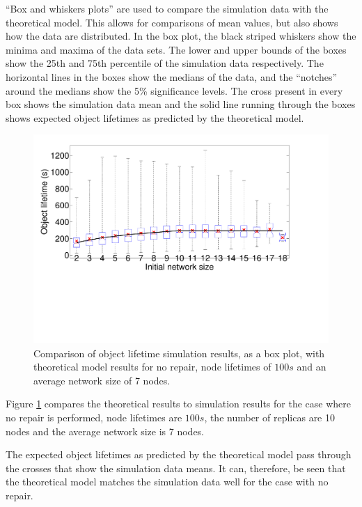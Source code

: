 \documentclass[10pt,a4paper,conference]{IEEEtran}
\begin{document}
``Box and whiskers plots'' are used to compare the simulation data with the theoretical model. This allows for comparisons of mean values, but also shows how the data are distributed. In the box plot, the black striped whiskers show the minima and maxima of the data sets. The lower and upper bounds of the boxes show the 25th and 75th percentile of the simulation data respectively. The horizontal lines in the boxes show the medians of the data, and the ``notches'' around the medians show the 5\% significance levels. The cross present in every box shows the simulation data mean and the solid line running through the boxes shows expected object lifetimes as predicted by the theoretical model.

\begin{figure}[htbp]
 \centering
 \includegraphics[clip=true, viewport=0.5cm 7.0cm 26.0cm 20.0cm, width=\columnwidth]{lifetime_simulation_model_none_100}
 \caption{Comparison of object lifetime simulation results, as a box plot, with theoretical model results for no repair, node lifetimes of $100 s$ and an average network size of 7 nodes.}
 \label{fig_lifetime_simulation_model_none_100}
\end{figure}
%
Figure \ref{fig_lifetime_simulation_model_none_100} compares the theoretical results to simulation results for the case where no repair is performed, node lifetimes are $100 s$, the number of replicas are 10 nodes and the average network size is 7 nodes.

The expected object lifetimes as predicted by the theoretical model pass through the crosses that show the simulation data means. It can, therefore, be seen that the theoretical model matches the simulation data well for the case with no repair.
\end{document}

